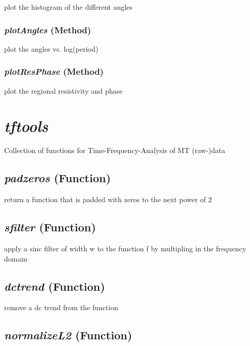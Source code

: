 plot the histogram of the different angles

\subsubsection{\textit{plotAngles} (Method)}
\label{sssec:processing.striketools.Strike.plotAngles}

plot the angles vs. log(period)

\subsubsection{\textit{plotResPhase} (Method)}
\label{sssec:processing.striketools.Strike.plotResPhase}

plot the regional resistivity and phase




\section{\textit{tftools} }
\label{sec:processing.tftools}

Collection of functions for Time-Frequency-Analysis of MT (raw-)data

\subsection{\textit{padzeros} (Function)}
\label{ssec:processing.tftools.padzeros}

return a function that is padded with zeros to the next
    power of 2

\subsection{\textit{sfilter} (Function)}
\label{ssec:processing.tftools.sfilter}

apply a sinc filter of width w to the function f by multipling in
    the frequency domain

\subsection{\textit{dctrend} (Function)}
\label{ssec:processing.tftools.dctrend}

remove a dc trend from the function 

\subsection{\textit{normalizeL2} (Function)}
\label{ssec:processing.tftools.normalizeL2}

